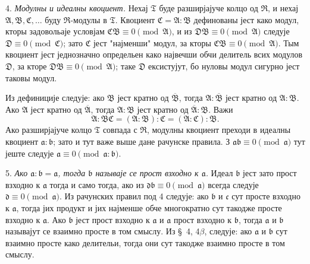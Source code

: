 \documentclass[11pt]{article}
\providecommand{\mR}{\mathfrak{R}}
\providecommand{\mT}{\mathfrak{T}}
\providecommand{\mA}{\mathfrak{A}}
\providecommand{\mB}{\mathfrak{B}}
\providecommand{\mC}{\mathfrak{C}}
\providecommand{\mD}{\mathfrak{D}}
\providecommand{\ma}{\mathfrak{a}}
\providecommand{\mb}{\mathfrak{b}}
\providecommand{\mc}{\mathfrak{c}}
\providecommand{\md}{\mathfrak{d}}
\begin{document}
4. \emph{Модулны и идеалны квоциент.} Нехај $\mT$ буде разширјајуче колцо од $\mR$, и нехај $\mA,\mB,\mC,\ldots$ буду $\mR$-модулы в $\mT$. Квоциент $\mC=\mA:\mB$ дефинованы јест како модул, кторы задовольаје условјам $\mC\mB\equiv0\pmod{\mA}$, и из $\mD\mB\equiv0\pmod{\mA}$ следује $\mD\equiv0\pmod{\mC}$; зато $\mC$ јест "најменши" модул, за кторы $\mC\mB\equiv0\pmod{\mA}$. Тым квоциент јест једнозначно определьен како највечши обчи делитель всих модулов $\mD$, за кторе $\mD\mB\equiv0\pmod{\mA}$; таке $\mD$ ексистујут, бо нуловы модул сигурно јест таковы модул.

Из дефиниције следује: ако $\mB$ јест кратно од $\overline{\mB}$, тогда $\mA:\overline{\mB}$ јест кратно од $\mA:\mB$. Ако $\mA$ јест кратно од $\overline{\mA}$, тогда $\mA:\mB$ јест кратно од $\overline{\mA}:\mB$. Важи
\[
        \mA:\mB\mC=(\mA:\mB):\mC=(\mA:\mC):\mB .
\]
Ако разширјајуче колцо $\mT$ совпада с $\mR$, модулны квоциент преходи в идеалны квоциент $\ma:\mb$; зато и тут важе выше дане рачунске правила. З $\ma\mb\equiv0\pmod{\ma}$ тут јеште следује $\ma\equiv0\pmod{\ma:\mb}$.

5. \emph{Ако $\ma:\mb=\ma$, тогда $\mb$ называје се прост взходно к $\ma$.} Идеал $\mb$ јест зато прост взходно к $\ma$ тогда и само тогда, ако из $\md\mb\equiv0\pmod{\ma}$ всегда следује $\md\equiv0\pmod{\ma}$. Из рачунских правил под 4 следује: ако $\mb$ и $\mc$ сут просте взходно к $\ma$, тогда јих продукт и јих најменше обче многократно сут такодже просте взходно к $\ma$. Ако $\mb$ јест прост взходно к $\ma$ и $\ma$ прост взходно к $\mb$, тогда $\ma$ и $\mb$ называјут се взаимно просте в том смыслу. Из \S~4, 4$\beta$, следује: ако $\ma$ и $\mb$ сут взаимно просте како делительи, тогда они сут такодже взаимно просте в том смыслу.
\end{document}
